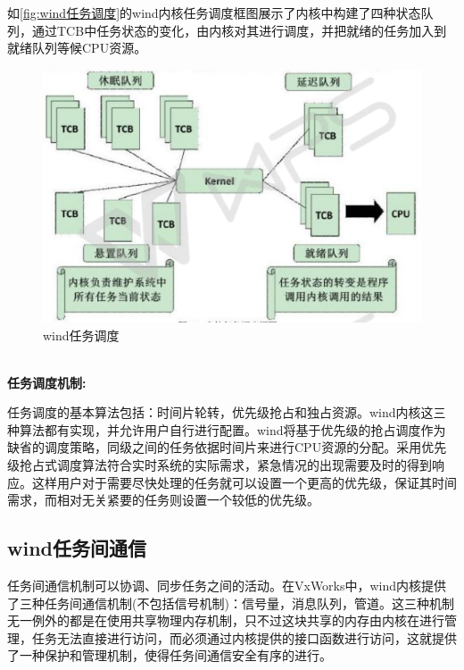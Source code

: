 	如\autoref{fig:wind任务调度}的wind内核任务调度框图展示了内核中构建了四种状态队列，通过TCB中任务状态的变化，由内核对其进行调度，并把就绪的任务加入到就绪队列等候CPU资源。
\begin{figure}[!h]
\centering
\includegraphics[width=.9\textwidth]{./graphics/vxworks-task-scheduling-diagram.pdf}
\caption{wind任务调度}\label{fig:wind任务调度}
\end{figure}\\
\textbf{任务调度机制:}

	任务调度的基本算法包括：时间片轮转，优先级抢占和独占资源。wind内核这三种算法都有实现，并允许用户自行进行配置。wind将基于优先级的抢占调度作为缺省的调度策略，同级之间的任务依据时间片来进行CPU资源的分配。采用优先级抢占式调度算法符合实时系统的实际需求，紧急情况的出现需要及时的得到响应。这样用户对于需要尽快处理的任务就可以设置一个更高的优先级，保证其时间需求，而相对无关紧要的任务则设置一个较低的优先级。

\subsection{wind任务间通信}
	任务间通信机制可以协调、同步任务之间的活动。在VxWorks中，wind内核提供了三种任务间通信机制(不包括信号机制)：信号量，消息队列，管道。这三种机制无一例外的都是在使用共享物理内存机制，只不过这块共享的内存由内核在进行管理，任务无法直接进行访问，而必须通过内核提供的接口函数进行访问，这就提供了一种保护和管理机制，使得任务间通信安全有序的进行。

